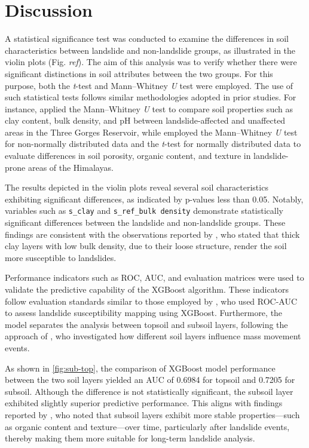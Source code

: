 \section{Discussion}

A statistical significance test was conducted to examine the differences in soil characteristics between landslide and non-landslide groups, as illustrated in the violin plots (Fig. \textit{ref}). The aim of this analysis was to verify whether there were significant distinctions in soil attributes between the two groups. For this purpose, both the \textit{t}-test and Mann–Whitney \textit{U} test were employed. The use of such statistical tests follows similar methodologies adopted in prior studies. For instance, \cite{disc01} applied the Mann–Whitney \textit{U} test to compare soil properties such as clay content, bulk density, and pH between landslide-affected and unaffected areas in the Three Gorges Reservoir, while \cite{disc02} employed the Mann–Whitney \textit{U} test for non-normally distributed data and the \textit{t}-test for normally distributed data to evaluate differences in soil porosity, organic content, and texture in landslide-prone areas of the Himalayas.

The results depicted in the violin plots reveal several soil characteristics exhibiting significant differences, as indicated by p-values less than 0.05. Notably, variables such as \texttt{s\_clay} and \texttt{s\_ref\_bulk density} demonstrate statistically significant differences between the landslide and non-landslide groups. These findings are consistent with the observations reported by \cite{disc03}, who stated that thick clay layers with low bulk density, due to their loose structure, render the soil more susceptible to landslides.

Performance indicators such as ROC, AUC, and evaluation matrices were used to validate the predictive capability of the XGBoost algorithm. These indicators follow evaluation standards similar to those employed by \cite{disc04}, who used ROC-AUC to assess landslide susceptibility mapping using XGBoost. Furthermore, the model separates the analysis between topsoil and subsoil layers, following the approach of \cite{disc05}, who investigated how different soil layers influence mass movement events.

As shown in \ref{fig:sub-top}, the comparison of XGBoost model performance between the two soil layers yielded an AUC of 0.6984 for topsoil and 0.7205 for subsoil. Although the difference is not statistically significant, the subsoil layer exhibited slightly superior predictive performance. This aligns with findings reported by \cite{disc06}, who noted that subsoil layers exhibit more stable properties—such as organic content and texture—over time, particularly after landslide events, thereby making them more suitable for long-term landslide analysis.

